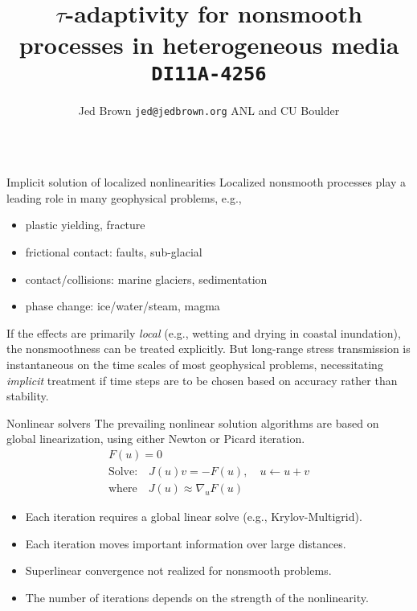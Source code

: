\documentclass[final,t]{beamer}
\title{\huge $\tau$-adaptivity for nonsmooth processes in heterogeneous media {\normalsize \texttt{DI11A-4256}}}
\author[Jed Brown]{Jed Brown {\texttt{jed@jedbrown.org}} ANL and CU Boulder}
\institute[MCS]{Download this poster from \url{https://jedbrown.org/files/20141215-AGUTauAdaptivity.pdf}}
\begin{document}
\begin{frame}{} 
  \vspace{-3em}
  \begin{columns}
    \begin{column}{0.31\textwidth}
      \begin{block}{Implicit solution of localized nonlinearities}
        Localized nonsmooth processes play a leading role in many geophysical problems, e.g.,
        \begin{itemize}
        \item plastic yielding, fracture
        \item frictional contact: faults, sub-glacial
        \item contact/collisions: marine glaciers, sedimentation
        \item phase change: ice/water/steam, magma
        \end{itemize}
        If the effects are primarily \emph{local} (e.g., wetting and drying in coastal inundation), the nonsmoothness can be treated explicitly.
        But long-range stress transmission is instantaneous on the time scales of most geophysical problems, necessitating \emph{implicit} treatment if time steps are to be chosen based on accuracy rather than stability.
      \end{block}
      \vspace{-2em}
      \begin{block}{Nonlinear solvers}
        The prevailing nonlinear solution algorithms are based on global linearization, using either Newton or Picard iteration.
        \begin{gather*}
          F(u) = 0 \\
          \text{Solve:}\quad J(u) v = -F(u), \quad u \gets u + v \\
          \text{where}\quad J(u) \approx \nabla_u F(u)
        \end{gather*}
        \begin{itemize}
        \item Each iteration requires a global linear solve (e.g., Krylov-Multigrid).
        \item Each iteration moves important information over large distances.
        \item Superlinear convergence not realized for nonsmooth problems.
        \item The number of iterations depends on the strength of the nonlinearity.
        \end{itemize}
      \end{block}

\end{column}
\end{columns}
\end{frame}
\end{document}
